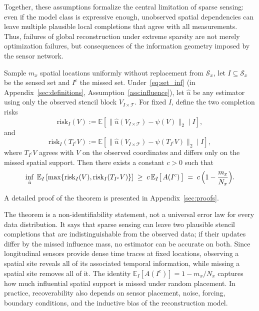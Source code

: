 Together, these assumptions formalize the central limitation of sparse sensing: even if the model class is expressive enough, unobserved spatial dependencies can leave multiple plausible local completions that agree with all measurements. Thus, failures of global reconstruction under extreme sparsity are not merely optimization failures, but consequences of the information geometry imposed by the sensor network.

\begin{theorem}
\label{prop:avg_long}
Sample $m_x$ spatial locations uniformly without replacement from $\mathcal{S}_x$, let $I\subseteq\mathcal{S}_x$ be the sensed set and $I^c$ the missed set.
Under~\eqref{eq:set_inf} (in Appendix~\ref{sec:definitions}, Assumption~\ref{ass:influence}), let $\hat u$ be any estimator using only the observed stencil block $V_{I\times\mathcal{T}}$. For fixed $I$, define the two completion risks
\[
\mathrm{risk}_I(V)
:=
\mathbb{E}\!\left[
\|\hat u(V_{I\times\mathcal{T}})-\psi(V)\|_2
\mid I
\right],
\]
and
\[
\mathrm{risk}_I(T_{I^c}V)
:=
\mathbb{E}\!\left[
\|\hat u(V_{I\times\mathcal{T}})-\psi(T_{I^c}V)\|_2
\mid I
\right],
\]
where $T_{I^c}V$ agrees with $V$ on the observed coordinates and differs only on the missed spatial support. Then there exists a constant $c>0$ such that
\[
\inf_{\hat u}\;
\mathbb{E}_I
\left[
\max\{\mathrm{risk}_I(V),\mathrm{risk}_I(T_{I^c}V)\}
\right]
\;\ge\;
c\,\mathbb{E}_I\bigl[\,A(I^c)\,\bigr]
\;=\;
c\,\Bigl(1-\frac{m_x}{N_x}\Bigr).
\]
\end{theorem}

A detailed proof of the theorem is presented in Appendix~\ref{sec:proofs}.

\begin{remark}
The theorem is a non-identifiability statement, not a universal error law for every data distribution. It says that sparse sensing can leave two plausible stencil completions that are indistinguishable from the observed data; if their updates differ by the missed influence mass, no estimator can be accurate on both. Since longitudinal sensors provide dense time traces at fixed locations, observing a spatial site reveals all of its associated temporal information, while missing a spatial site removes all of it. The identity $\mathbb{E}_I[A(I^c)]=1-m_x/N_x$ captures how much influential spatial support is missed under random placement. In practice, recoverability also depends on sensor placement, noise, forcing, boundary conditions, and the inductive bias of the reconstruction model.
\end{remark}

